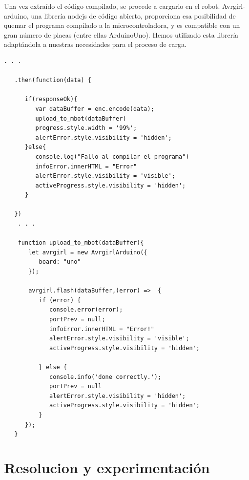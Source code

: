 \documentclass{report}
\begin{document}
Una vez extraído el código compilado, se procede a cargarlo en el robot. Avrgirl-arduino, una librería nodejs de código abierto, proporciona esa posibilidad de quemar el programa compilado a la microcontroladora, y es compatible con un gran número de placas (entre ellas ArduinoUno). Hemos utilizado esta librería adaptándola a nuestras necesidades para el proceso de carga.
\\
\begin{lstlisting}[frame=single,breaklines=true, label="Cargar del compilado al Mbot", caption="Cargar del compilado al Mbot", captionpos=b]
   . . . 
   
   .then(function(data) {

      if(responseOk){
         var dataBuffer = enc.encode(data);
         upload_to_mbot(dataBuffer)
         progress.style.width = '99%';
         alertError.style.visibility = 'hidden';
      }else{
         console.log("Fallo al compilar el programa")
         infoError.innerHTML = "Error"
         alertError.style.visibility = 'visible';
         activeProgress.style.visibility = 'hidden';
      }

   })
    . . . 
    
    function upload_to_mbot(dataBuffer){
       let avrgirl = new AvrgirlArduino({
          board: "uno"
       });

       avrgirl.flash(dataBuffer,(error) =>  {
          if (error) {
             console.error(error);
             portPrev = null;
             infoError.innerHTML = "Error!"
             alertError.style.visibility = 'visible';
             activeProgress.style.visibility = 'hidden';

          } else {
             console.info('done correctly.');
             portPrev = null
             alertError.style.visibility = 'hidden';
             activeProgress.style.visibility = 'hidden';
          }
      });
   }

\end{lstlisting}

\section{Resolucion y experimentación}
\end{document}
